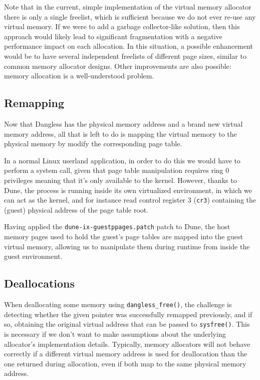 Note that in the current, simple implementation of the virtual memory allocator there is only a single freelist, which is sufficient because we do not ever re-use any virtual memory. If we were to add a garbage collector-like solution, then this approach would likely lead to significant fragmentation with a negative performance impact on each allocation. In this situation, a possible enhancement would be to have several independent freelists of different page sizes, similar to common memory allocator designs. Other improvements are also possible: memory allocation is a well-understood problem.

\subsection{Remapping}


Now that Dangless has the physical memory address and a brand new virtual memory address, all that is left to do is mapping the virtual memory to the physical memory by modify the corresponding page table.

In a normal Linux userland application, in order to do this we would have to perform a system call, given that page table manipulation requires ring 0 privileges meaning that it's only available to the kernel. However, thanks to Dune, the process is running inside its own virtualized environment, in which we can act as the kernel, and for instance read control register 3 (\lstinline!cr3!) containing the (guest) physical address of the page table root.

Having applied the \texttt{dune-ix-guestppages.patch} patch to Dune, the host memory pages used to hold the guest's page tables are mapped into the guest virtual memory, allowing us to manipulate them during runtime from inside the guest environment.

\subsection{Deallocations}
\label{ssec:deallocations}

When deallocating some memory using \lstinline!dangless_free()!, the challenge is detecting whether the given pointer was successfully remapped previously, and if so, obtaining the original virtual address that can be passed to \lstinline!sysfree()!.
This is necessary if we don't want to make assumptions about the underlying allocator's implementation details. Typically, memory allocators will not behave correctly if a different virtual memory address is used for deallocation than the one returned during allocation, even if both map to the same physical memory address.

